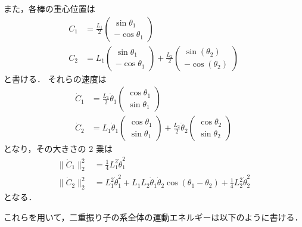 また，各棒の重心位置は
\begin{align}
    C_1 & = \frac{L_1}{2} \begin{pmatrix}
                              \sin\theta_1 \\
                              -\cos\theta_1
                          \end{pmatrix}
    \\
    C_2 & = L_1 \begin{pmatrix}
                    \sin\theta_1 \\
                    -\cos\theta_1
                \end{pmatrix}
    + \frac{L_2}{2} \begin{pmatrix}
                        \sin(\theta_2) \\
                        -\cos(\theta_2)
                    \end{pmatrix}
\end{align}
と書ける．
それらの速度は
\begin{align}
    \dot{C}_1 & = \frac{L_1}{2} \dot{\theta}_1 \begin{pmatrix}
                                                   \cos\theta_1 \\
                                                   \sin\theta_1
                                               \end{pmatrix}
    \\
    \dot{C}_2 & = L_1 \dot{\theta}_1 \begin{pmatrix}
                                         \cos\theta_1 \\
                                         \sin\theta_1
                                     \end{pmatrix}
    + \frac{L_2}{2} \dot{\theta}_2 \begin{pmatrix}
                                       \cos\theta_2 \\
                                       \sin\theta_2
                                   \end{pmatrix}
\end{align}
となり，その大きさの 2 乗は
\begin{align}
    \|\dot{C}_1\|_2^2
     & = \frac{1}{4} L_1^2 \dot{\theta}_1^2
    \\
    \|\dot{C}_2\|_2^2
     & = L_1^2 \dot{\theta}_1^2
    + L_1 L_2 \dot{\theta}_1 \dot{\theta}_2 \cos(\theta_1 - \theta_2)
    + \frac{1}{4} L_2^2 \dot{\theta}_2^2
\end{align}
となる．

これらを用いて，二重振り子の系全体の運動エネルギーは以下のように書ける．
